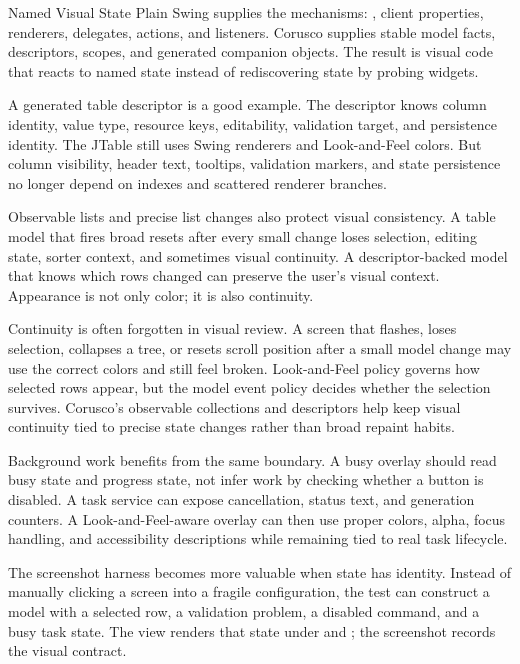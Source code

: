 \begin{coruscobox}{Named Visual State}
Plain Swing supplies the mechanisms: , client properties, renderers, delegates, actions, and listeners. Corusco supplies stable model facts, descriptors, scopes, and generated companion objects. The result is visual code that reacts to named state instead of rediscovering state by probing widgets.
\end{coruscobox}

A generated table descriptor is a good example. The descriptor knows column identity, value type, resource keys, editability, validation target, and persistence identity. The JTable still uses Swing renderers and Look-and-Feel colors. But column visibility, header text, tooltips, validation markers, and state persistence no longer depend on indexes and scattered renderer branches.

Observable lists and precise list changes also protect visual consistency. A table model that fires broad resets after every small change loses selection, editing state, sorter context, and sometimes visual continuity. A descriptor-backed model that knows which rows changed can preserve the user's visual context. Appearance is not only color; it is also continuity.

Continuity is often forgotten in visual review. A screen that flashes, loses selection, collapses a tree, or resets scroll position after a small model change may use the correct colors and still feel broken. Look-and-Feel policy governs how selected rows appear, but the model event policy decides whether the selection survives. Corusco's observable collections and descriptors help keep visual continuity tied to precise state changes rather than broad repaint habits.

Background work benefits from the same boundary. A busy overlay should read busy state and progress state, not infer work by checking whether a button is disabled. A task service can expose cancellation, status text, and generation counters. A Look-and-Feel-aware overlay can then use proper colors, alpha, focus handling, and accessibility descriptions while remaining tied to real task lifecycle.

The screenshot harness becomes more valuable when state has identity. Instead of manually clicking a screen into a fragile configuration, the test can construct a model with a selected row, a validation problem, a disabled command, and a busy task state. The view renders that state under \flatlaf{} and \miglayout{}; the screenshot records the visual contract.


